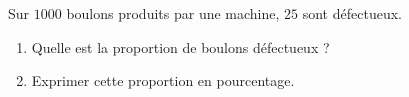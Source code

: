 
\begin{exercice}\label{exo2smath-0297}

    Sur \( 1000\) boulons produits par une machine, \( 25\) sont défectueux.
    \begin{enumerate}
        \item
            Quelle est la proportion de boulons défectueux ?
        \item
            Exprimer cette proportion en pourcentage.
    \end{enumerate}

\end{exercice}

